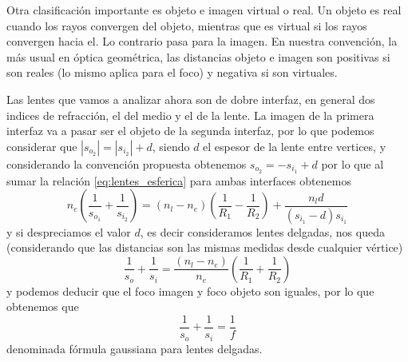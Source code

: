 \documentclass[a4paper,spanish]{article}
\numberwithin{equation}{section}
\begin{document}
		Otra clasificaci\'on importante es objeto e imagen virtual o real. Un objeto es real cuando los rayos convergen del objeto, mientras que es virtual si los rayos convergen hacia el. Lo contrario pasa para la imagen. En nuestra convenci\'on, la m\'as usual en \'optica geom\'etrica, las distancias objeto e imagen son positivas si son reales (lo mismo aplica para el foco) y negativa si son virtuales.
		
		Las lentes que vamos a analizar ahora son de dobre interfaz, en general dos indices de refracci\'on, el del medio y el de la lente. La imagen de la primera interfaz va a pasar ser el objeto de la segunda interfaz, por lo que podemos considerar que $|s_{o_2}| = |s_{i_2}| + d$, siendo $d$ el espesor de la lente entre vertices, y considerando la convenci\'on propuesta obtenemos $s_{o_2} = - s_{i_1} + d$ por lo que al sumar la relaci\'on \ref{eq:lentes_esferica} para ambas interfaces obtenemos
		\begin{equation}
			n_{e} \left(\frac{1}{s_{o_1}} + \frac{1}{s_{i_2}}\right) = (n_l - n_e)\left(\frac{1}{R_1} - \frac{1}{R_2}\right) + \frac{n_l d}{(s_{i_1} - d) s_{i_1}}
			\label{eq:lentes_general}
		\end{equation}
		y si despreciamos el valor $d$, es decir consideramos lentes delgadas, nos queda (considerando que las distancias son las mismas medidas desde cualquier v\'ertice)
		\begin{equation}
			\frac{1}{s_o} + \frac{1}{s_i} = \frac{(n_l - n_e)}{n_e} \left(\frac{1}{R_1} + \frac{1}{R_2}\right)
			\label{eq:lentes_constructores}
		\end{equation}
		y podemos deducir que el foco imagen y foco objeto son iguales, por lo que obtenemos que
		\begin{equation}
			\frac{1}{s_o} + \frac{1}{s_i} = \frac{1}{f}
			\label{eq:lentes_guassiana}
		\end{equation}
		denominada f\'ormula gaussiana para lentes delgadas.
		
\end{document}
